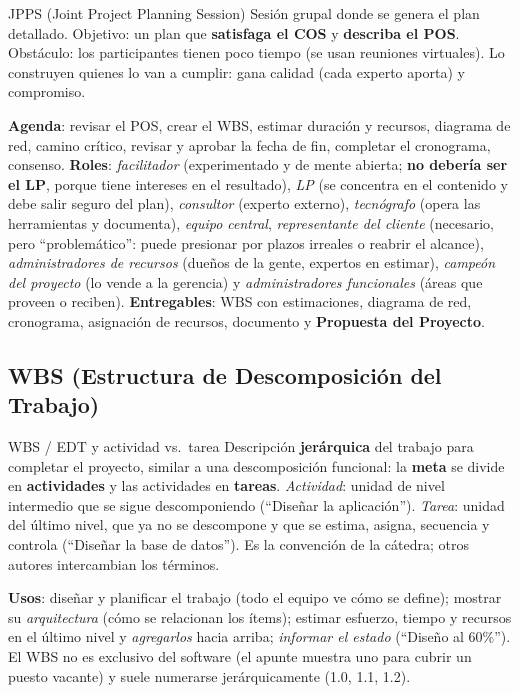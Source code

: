 \documentclass[11pt,a4paper]{article}
\begin{document}
\begin{defbox}{JPPS (Joint Project Planning Session)}
Sesión grupal donde se genera el plan detallado. Objetivo: un plan que \textbf{satisfaga el COS} y
\textbf{describa el POS}. Obstáculo: los participantes tienen poco tiempo (se usan reuniones virtuales). Lo
construyen quienes lo van a cumplir: gana calidad (cada experto aporta) y compromiso.
\end{defbox}
\textbf{Agenda}: revisar el POS, crear el WBS, estimar duración y recursos, diagrama de red, camino crítico,
revisar y aprobar la fecha de fin, completar el cronograma, consenso. \textbf{Roles}: \emph{facilitador}
(experimentado y de mente abierta; \textbf{no debería ser el LP}, porque tiene intereses en el resultado),
\emph{LP} (se concentra en el contenido y debe salir seguro del plan), \emph{consultor} (experto externo),
\emph{tecnógrafo} (opera las herramientas y documenta), \emph{equipo central}, \emph{representante del
cliente} (necesario, pero ``problemático'': puede presionar por plazos irreales o reabrir el alcance),
\emph{administradores de recursos} (dueños de la gente, expertos en estimar), \emph{campeón del proyecto} (lo
vende a la gerencia) y \emph{administradores funcionales} (áreas que proveen o reciben). \textbf{Entregables}:
WBS con estimaciones, diagrama de red, cronograma, asignación de recursos, documento y \textbf{Propuesta del
Proyecto}.

\subsection{WBS (Estructura de Descomposición del Trabajo)}
\begin{defbox}{WBS / EDT y actividad vs.\ tarea}
Descripción \textbf{jerárquica} del trabajo para completar el proyecto, similar a una descomposición funcional:
la \textbf{meta} se divide en \textbf{actividades} y las actividades en \textbf{tareas}. \emph{Actividad}:
unidad de nivel intermedio que se sigue descomponiendo (``Diseñar la aplicación''). \emph{Tarea}: unidad del
último nivel, que ya no se descompone y que se estima, asigna, secuencia y controla (``Diseñar la base de
datos''). Es la convención de la cátedra; otros autores intercambian los términos.
\end{defbox}
\textbf{Usos}: diseñar y planificar el trabajo (todo el equipo ve cómo se define); mostrar su
\emph{arquitectura} (cómo se relacionan los ítems); estimar esfuerzo, tiempo y recursos en el último nivel y
\emph{agregarlos} hacia arriba; \emph{informar el estado} (``Diseño al 60\%''). El WBS no es exclusivo del
software (el apunte muestra uno para cubrir un puesto vacante) y suele numerarse jerárquicamente (1.0, 1.1, 1.2).
\end{document}

